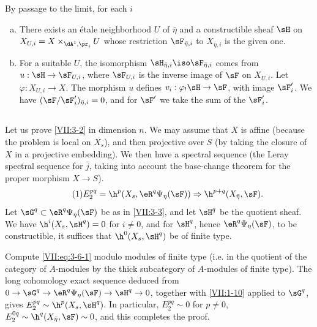 \documentclass[oneside]{book}
\begin{document}
By passage to the limit, for each $i$
\begin{enumerate}[a)]
  \item There exists an étale neighborhood $U$ of $\bar\eta$ and a
    constructible sheaf $\sH$ on
    $X_{U,i} = X\times_{\dA^1,\pr_i} U$ whose restriction
    $\sF_{\bar\eta,i}$ to $X_{\bar\eta,i}$ is the given one.
  \item For a suitable $U$, the isomorphism
    $\sH_{\bar\eta,i} \iso \sF_{\bar\eta,i}$ comes from
    $u:\sH\to \sF_{U,i}$, where $\sF_{U,i}$ is the inverse image of $\sF$ on
    $X_{U,i}$. Let $\varphi:X_{U,i} \to X$. The morphism $u$ defines
    $v_i:\varphi_! \sH \to \sF$, with image $\sF_i'$. We have
    $(\sF/\sF_i')_{\bar\eta,i} = 0$, and for $\sF'$ we take the sum of the
    $\sF_i'$.
\end{enumerate}






\subsection{}\label{VII:3-6}

Let us prove \ref{VII:3-2} in dimension $n$. We may assume that $X$ is affine
(because the problem is local on $X_s$), and then projective over $S$ (by
taking the closure of $X$ in a projective embedding). We then have a spectral
sequence \cite[I 2.2.3]{sga7} (the Leray spectral sequence for $\bar j$, taking
into account the base-change theorem for the proper morphism $X\to S$).
\begin{equation*}\tag{1}\label{VII:eq:3-6-1}
  E_2^{p q} = \h^p(X_s,\eR^q\Psi_\eta(\sF)) \Rightarrow \h^{p+q}(X_{\bar\eta},\sF) \text{.} 
\end{equation*}
Let $\sG^q\subset \eR^q \Psi_\eta(\sF)$ be as in \ref{VII:3-3}, and let
$\sH^q$ be the quotient sheaf. We have $\h^i(X_s,\sH^q)=0$ for $i\ne 0$, and
for $\sH^q$, hence $\eR^q\Psi_\eta(\sF)$, to be constructible, it suffices
that $\h^0(X_s,\sH^q)$ be of finite type.

Compute \eqref{VII:eq:3-6-1} modulo modules of finite type (i.e. in the
quotient of the category of $A$-modules by the thick subcategory of
$A$-modules of finite type). The long cohomology exact sequence deduced from
$0 \to \sG^q \to \eR^q\Psi_\eta(\sF) \to \sH^q \to 0$, together with
\ref{VII:1-10} applied to $\sG^q$, gives
$E_2^{p q} \sim \h^p(X_s,\sH^q)$. In particular,
$E_2^{p q}\sim 0$ for $p\ne 0$,
$E_2^{0 q}\sim \h^q(X_{\bar\eta},\sF) \sim 0$, and this completes the proof.
\end{document}
